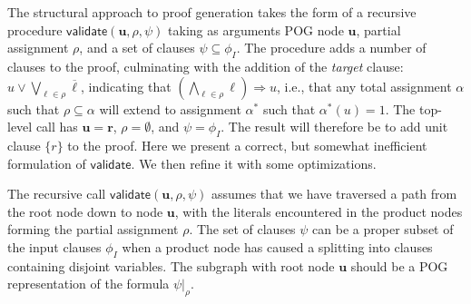 \documentclass[twoside,11pt]{article}
\newcommand{\obar}[1]{\overline{#1}}
\newcommand{\lit}{\ell}
\newcommand{\imply}{\Rightarrow}
\newcommand{\extend}[1]{#1^{*}}
\newcommand{\assign}{\alpha}
\newcommand{\eassign}{\extend{\alpha}}
\newcommand{\passign}{\rho}
\newcommand{\validate}{\textsf{validate}}
\newcommand{\inputformula}{\phi_I}
\newcommand{\makenode}[1]{\mathbf{#1}}
\newcommand{\nodeu}{\makenode{u}}
\newcommand{\noder}{\makenode{r}}
\newcommand{\simplify}[2]{#1|_{#2}}
\begin{document}
The structural approach to proof generation takes the form of a recursive procedure
$\validate(\nodeu, \passign, \psi)$ taking as arguments POG
node $\nodeu$, partial assignment
$\passign$, and a set of clauses $\psi \subseteq \inputformula$.
The procedure adds a number of clauses to the proof, culminating with
the addition of the \emph{target} clause:
$u \lor \bigvee_{\lit \in \passign} \obar{\lit}$, indicating
that $(\bigwedge_{\lit \in \passign} \lit) \imply u$, i.e.,
that any total
assignment $\assign$ such that $\passign \subseteq \assign$
will extend to assignment $\eassign$ such that $\eassign(u) = 1$.
The top-level call has $\nodeu = \noder$, $\passign = \emptyset$, and $\psi = \inputformula$.
The result will therefore be to add unit clause $\{r\}$ to the proof.
Here we present a correct, but somewhat inefficient formulation of
$\validate$.  We then refine it with some optimizations.

The recursive call $\validate(\nodeu, \passign, \psi)$ assumes that we have
traversed a path from the root node down to node $\nodeu$, with the
literals encountered in the product nodes forming the partial
assignment $\passign$.  The set of clauses $\psi$ can be a proper
subset of the input clauses $\inputformula$ when a product node has caused
a splitting into clauses containing disjoint variables.
The subgraph with root node $\nodeu$ should be a POG representation of the formula
$\simplify{\psi}{\passign}$.
\end{document}
